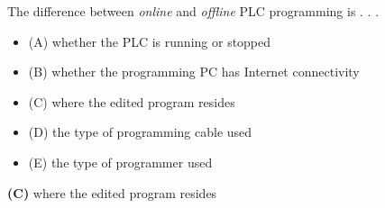 

The difference between {\it online} and {\it offline} PLC programming is . . .

\begin{itemize}
\item{(A)} whether the PLC is running or stopped
\vskip 5pt 
\item{(B)} whether the programming PC has Internet connectivity
\vskip 5pt 
\item{(C)} where the edited program resides
\vskip 5pt 
\item{(D)} the type of programming cable used
\vskip 5pt 
\item{(E)} the type of programmer used
\end{itemize}







{\bf (C)} where the edited program resides
 










